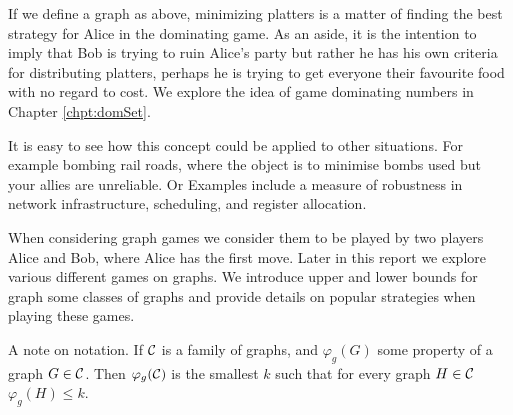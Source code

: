 If we define a graph as above, minimizing platters is a matter of finding the best strategy for Alice in the dominating game. 
As an aside, it is the intention to imply that Bob is trying to ruin Alice's party but rather he has his own criteria for distributing platters, perhaps he is trying to get everyone their favourite food with no regard to cost. We explore the idea of game dominating numbers in Chapter \ref{chpt:domSet}.

It is easy to see how this concept could be applied to other situations. For example bombing rail roads, where the object is to minimise bombs used but your allies are unreliable. Or Examples include a measure of robustness in network infrastructure, scheduling, and register allocation.  

When considering graph games we consider them to be played by two players Alice and Bob, where Alice has the first move. Later in this report we explore various different games on graphs. We introduce upper and lower bounds for graph some classes of graphs and provide details on popular strategies when playing these games.   




  
    
A note on notation. If $\mathcal{C}$ is a family of graphs, and $\varphi_g(G)$ some property of a graph $G \in \mathcal{C}$. Then $\varphi_g(\mathcal{C})$ is the smallest $k$ such that for every graph $H\in\mathcal{C}$ $\varphi_g(H)\leq k$.   

    
    
    
    
    
    
    
    
    
    
    
    
    
    
    
    
    
    
    
    
    